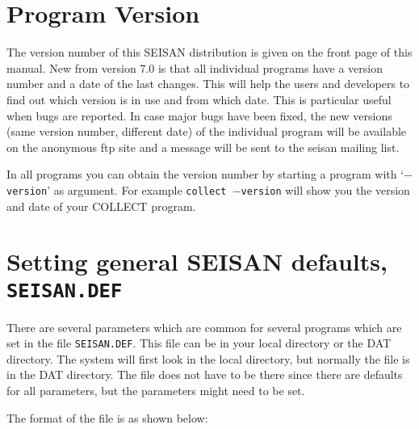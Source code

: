 

\section{Program Version} 

The version number of this SEISAN distribution is given on the front page of this manual. New from version 7.0 is that all individual programs have a version number and a date of the last changes. This will help the users and developers to find out which version is in use and from which date. This is particular useful when bugs are reported. In case major bugs have been fixed, the new versions (same version number, different date) of the individual program will be available on the anonymous ftp site and a message will be sent to the seisan mailing list. 

In all programs you can obtain the version number by starting a program 
with `\texttt{$-$version}' as argument. For example \texttt{collect $-$version} will show 
you the version and date of your COLLECT program. 

\section{Setting general SEISAN defaults, \texttt{SEISAN.DEF}}
\label{sect:seisan.def}

There are several parameters which are common for several programs which are set in the file \texttt{SEISAN.DEF}. This file can be in your local directory or the DAT directory. The system will first look in the local directory, but normally the file is in the DAT directory. The file does not have to be there since there are defaults for all parameters, but the parameters might need to be set. 

The format of the file is as shown below: 

%



